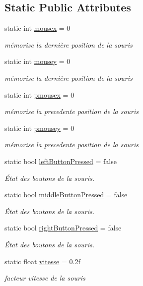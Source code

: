 \subsection*{Static Public Attributes}
\begin{DoxyCompactItemize}
\item 
static int \hyperlink{class_mouse_data_a97eb3138f2f52f859b0d16e683d8cfcb}{mousex} = 0
\begin{DoxyCompactList}\small\item\em mémorise la dernière position de la souris \end{DoxyCompactList}\item 
static int \hyperlink{class_mouse_data_aea43f059e0ff26829a0a8d8619b3f18c}{mousey} = 0
\begin{DoxyCompactList}\small\item\em mémorise la dernière position de la souris \end{DoxyCompactList}\item 
static int \hyperlink{class_mouse_data_a7694431e993365b4817ff2e9ac161555}{pmousex} = 0
\begin{DoxyCompactList}\small\item\em mémorise la precedente position de la souris \end{DoxyCompactList}\item 
static int \hyperlink{class_mouse_data_a35be8fdf24f27e0de5ba01e44bd6eb33}{pmousey} = 0
\begin{DoxyCompactList}\small\item\em mémorise la precedente position de la souris \end{DoxyCompactList}\item 
static bool \hyperlink{class_mouse_data_a0aba8d6075bdc8237efa484ffaeae14a}{left\+Button\+Pressed} = false
\begin{DoxyCompactList}\small\item\em État des boutons de la souris. \end{DoxyCompactList}\item 
static bool \hyperlink{class_mouse_data_a00962824d35b75221cc3198467cc8907}{middle\+Button\+Pressed} = false
\begin{DoxyCompactList}\small\item\em État des boutons de la souris. \end{DoxyCompactList}\item 
static bool \hyperlink{class_mouse_data_a224b54f7b421bdb8443133db38c1ae4b}{right\+Button\+Pressed} = false
\begin{DoxyCompactList}\small\item\em État des boutons de la souris. \end{DoxyCompactList}\item 
static float \hyperlink{class_mouse_data_a86d3b28c7d10597467bb0288e6863941}{vitesse} = 0.\+2f
\begin{DoxyCompactList}\small\item\em facteur vitesse de la souris \end{DoxyCompactList}\end{DoxyCompactItemize}


